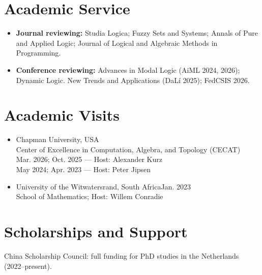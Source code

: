 \documentclass[11pt,a4paper]{article}
\begin{document}
\section*{Academic Service}
\begin{itemize}
\item \textbf{Journal reviewing:} Studia Logica; Fuzzy Sets and Systems; Annals of Pure and Applied Logic; Journal of Logical and Algebraic Methods in Programming.
\item \textbf{Conference reviewing:} Advances in Modal Logic (AiML 2024, 2026); Dynamic Logic. New Trends and Applications (DaL\'{i} 2025); FedCSIS 2026.
\end{itemize}

\section*{Academic Visits}
\begin{itemize}
\item Chapman University, USA\\
Center of Excellence in Computation, Algebra, and Topology (CECAT)\\
Mar. 2026; Oct. 2025 --- Host: Alexander Kurz\\
May 2024; Apr. 2023 --- Host: Peter Jipsen
\item University of the Witwatersrand, South Africa\hfill Jan. 2023\\
School of Mathematics; Host: Willem Conradie
\end{itemize}

\section*{Scholarships and Support}
China Scholarship Council: full funding for PhD studies in the Netherlands
(2022--present).
\end{document}
